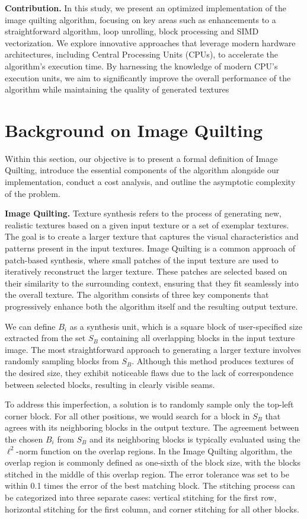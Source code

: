 \documentclass[letterpaper]{article}
\newcommand{\mypar}[1]{{\bf #1.}}
\begin{document}
\mypar{Contribution}
In this study, we present an optimized implementation of the image quilting algorithm, focusing on key areas such as enhancements to a straightforward algorithm, loop unrolling, block processing and SIMD vectorization. We explore innovative approaches that leverage modern hardware architectures, including Central Processing Units (CPUs), to accelerate the algorithm's execution time. By harnessing the knowledge of modern CPU's execution units, we aim to significantly improve the overall performance of the algorithm while maintaining the quality of generated textures

\section{Background on Image Quilting}\label{sec:background}

Within this section, our objective is to present a formal definition of Image Quilting, introduce the essential components of the algorithm alongside our implementation, conduct a cost analysis, and outline the asymptotic complexity of the problem.

\mypar{Image Quilting}
Texture synthesis refers to the process of generating new, realistic textures based on a given input texture or a set of exemplar textures. The goal is to create a larger texture that captures the visual characteristics and patterns present in the input textures.
Image Quilting is a common approach of patch-based synthesis, where small patches of the input texture are used to iteratively reconstruct the larger texture. These patches are selected based on their similarity to the surrounding context, ensuring that they fit seamlessly into the overall texture. The algorithm consists of three key components that progressively enhance both the algorithm itself and the resulting output texture.

We can define \textit{$B_{i}$} as a synthesis unit, which is a square block of user-specified size extracted from the set \textit{$S_{B}$} containing all overlapping blocks in the input texture image. The most straightforward approach to generating a larger texture involves randomly sampling blocks from \textit{$S_{B}$}. Although this method produces textures of the desired size, they exhibit noticeable flaws due to the lack of correspondence between selected blocks, resulting in clearly visible seams.

To address this imperfection, a solution is to randomly sample only the top-left corner block. For all other positions, we would search for a block in \textit{$S_{B}$} that agrees with its neighboring blocks in the output texture. The agreement between the chosen \textit{$B_{i}$} from \textit{$S_{B}$} and its neighboring blocks is typically evaluated using the $\ell ^2$-norm function on the overlap regions. In the Image Quilting algorithm, the overlap region is commonly defined as one-sixth of the block size, with the blocks stitched in the middle of this overlap region. The error tolerance was set to be within 0.1 times the error of the best matching block. The stitching process can be categorized into three separate cases: vertical stitching for the first row, horizontal stitching for the first column, and corner stitching for all other blocks.
\end{document}
